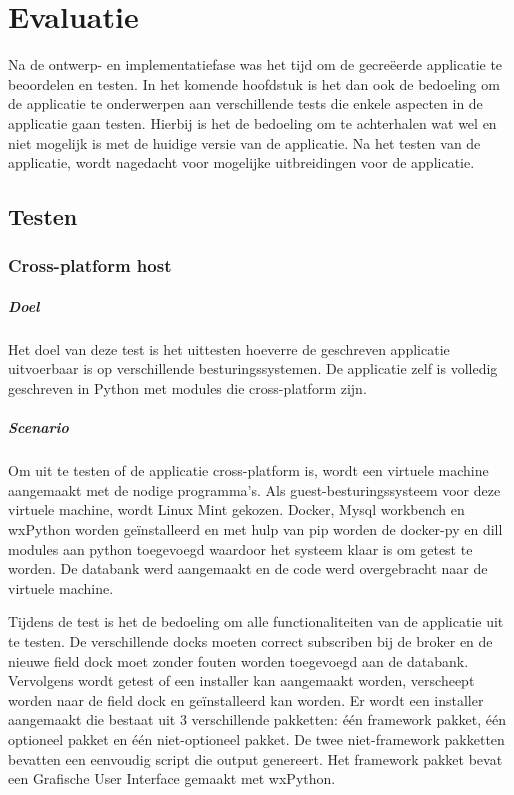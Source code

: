 \chapter{Evaluatie}
Na de ontwerp- en implementatiefase was het tijd om de gecreëerde applicatie te beoordelen en testen.
In het komende hoofdstuk is het dan ook de bedoeling om de applicatie te onderwerpen aan verschillende tests die enkele aspecten in de applicatie gaan testen.
Hierbij is het de bedoeling om te achterhalen wat wel en niet mogelijk is met de huidige versie van de applicatie.
Na het testen van de applicatie, wordt nagedacht voor mogelijke uitbreidingen voor de applicatie.

\section{Testen}
\subsection{Cross-platform host}
\paragraph{Doel}
Het doel van deze test is het uittesten hoeverre de geschreven applicatie uitvoerbaar is op verschillende besturingssystemen.
De applicatie zelf is volledig geschreven in Python met modules die cross-platform zijn.

\paragraph{Scenario}
Om uit te testen of de applicatie cross-platform is, wordt een virtuele machine aangemaakt met de nodige programma's.
Als guest-besturingssysteem voor deze virtuele machine, wordt Linux Mint gekozen. 
Docker, Mysql workbench en wxPython worden geïnstalleerd en met hulp van pip worden de docker-py en dill modules aan python toegevoegd waardoor het systeem klaar is om getest te worden.
De databank werd aangemaakt en de code werd overgebracht naar de virtuele machine.

Tijdens de test is het de bedoeling om alle functionaliteiten van de applicatie uit te testen.
De verschillende docks moeten correct subscriben bij de broker en de nieuwe field dock moet zonder fouten worden toegevoegd aan de databank.
Vervolgens wordt getest of een installer kan aangemaakt worden, verscheept worden naar de field dock en geïnstalleerd kan worden.
Er wordt een installer aangemaakt die bestaat uit 3 verschillende pakketten: één framework pakket, één optioneel pakket en één niet-optioneel pakket.
De twee niet-framework pakketten bevatten een eenvoudig script die output genereert.
Het framework pakket bevat een Grafische User Interface gemaakt met wxPython.

